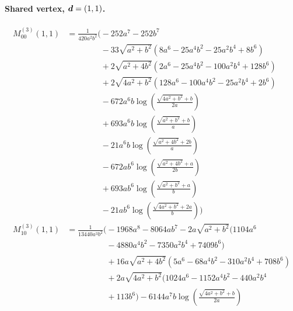 \paragraph{Shared vertex, $\vb*{d}=(1,1)$.}
\begin{align*}
M^{(3)}_{00}(1,1) &= \frac{1}{420 a^{2} b^{2}}\Bigg(- 252 a^{7} - 252 b^{7}\\
&\phantom{{}=\frac{1}{420 a^{2} b^{2}}\Bigg(}- 33 \sqrt{a^{2} + b^{2}}\left(8 a^{6} - 25 a^{4} b^{2} - 25 a^{2} b^{4} + 8 b^{6}\right)\\
&\phantom{{}=\frac{1}{420 a^{2} b^{2}}\Bigg(}+ 2 \sqrt{a^{2} + 4 b^{2}}\left(2 a^{6} - 25 a^{4} b^{2} - 100 a^{2} b^{4} + 128 b^{6}\right)\\
&\phantom{{}=\frac{1}{420 a^{2} b^{2}}\Bigg(}+ 2 \sqrt{4 a^{2} + b^{2}}\left(128 a^{6} - 100 a^{4} b^{2} - 25 a^{2} b^{4} + 2 b^{6}\right)\\
&\phantom{{}=\frac{1}{420 a^{2} b^{2}}\Bigg(}- 672 a^{6} b \log\left(\frac{\sqrt{4 a^{2} + b^{2}} + b}{2 a}\right)\\
&\phantom{{}=\frac{1}{420 a^{2} b^{2}}\Bigg(}+ 693 a^{6} b \log\left(\frac{\sqrt{a^{2} + b^{2}} + b}{a}\right)\\
&\phantom{{}=\frac{1}{420 a^{2} b^{2}}\Bigg(}- 21 a^{6} b \log\left(\frac{\sqrt{a^{2} + 4 b^{2}} + 2 b}{a}\right)\\
&\phantom{{}=\frac{1}{420 a^{2} b^{2}}\Bigg(}- 672 a b^{6} \log\left(\frac{\sqrt{a^{2} + 4 b^{2}} + a}{2 b}\right)\\
&\phantom{{}=\frac{1}{420 a^{2} b^{2}}\Bigg(}+ 693 a b^{6} \log\left(\frac{\sqrt{a^{2} + b^{2}} + a}{b}\right)\\
&\phantom{{}=\frac{1}{420 a^{2} b^{2}}\Bigg(}- 21 a b^{6} \log\left(\frac{\sqrt{4 a^{2} + b^{2}} + 2 a}{b}\right)\Bigg)\\[1.2ex]
M^{(3)}_{10}(1,1) &= \frac{1}{13440 a^{3} b^{2}}\Bigg(- 1968 a^{8} - 8064 a b^{7} - 2 a \sqrt{a^{2} + b^{2}}\bigl(1104 a^{6}\\
&\phantom{{}=\frac{1}{13440 a^{3} b^{2}}\Bigg(}- 4880 a^{4} b^{2} - 7350 a^{2} b^{4} + 7409 b^{6}\bigr)\\
&\phantom{{}=\frac{1}{13440 a^{3} b^{2}}\Bigg(}+ 16 a \sqrt{a^{2} + 4 b^{2}}\left(5 a^{6} - 68 a^{4} b^{2} - 310 a^{2} b^{4} + 708 b^{6}\right)\\
&\phantom{{}=\frac{1}{13440 a^{3} b^{2}}\Bigg(}+ 2 a \sqrt{4 a^{2} + b^{2}}\bigl(1024 a^{6} - 1152 a^{4} b^{2} - 440 a^{2} b^{4}\\
&\phantom{{}=\frac{1}{13440 a^{3} b^{2}}\Bigg(}+ 113 b^{6}\bigr) - 6144 a^{7} b \log\left(\frac{\sqrt{4 a^{2} + b^{2}} + b}{2 a}\right)\\

\end{align*}
